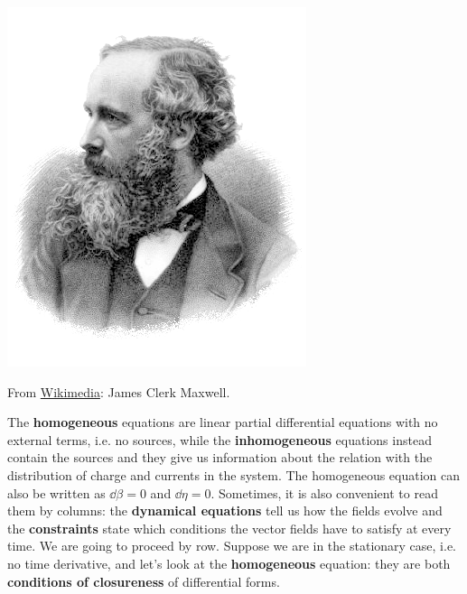 \documentclass[../main.tex]{subfiles}
\begin{document}
\begin{marginfigure}[-10mm]
	\includegraphics[width=1\linewidth]{images/James_Clerk_Maxwell.png}
	\caption[Photo of Maxwell]{From \href{https://commons.wikimedia.org/wiki/File:James_Clerk_Maxwell.png}{Wikimedia}: James Clerk Maxwell.}
\end{marginfigure}The \textbf{homogeneous} equations are linear partial differential equations with no external terms, i.e. no sources, while the \textbf{inhomogeneous} equations instead contain the sources and they give us information about the relation with the distribution of charge and currents in the system. The homogeneous equation can also be written as $\dd\beta=0$ and $\dd\eta=0$. Sometimes, it is also convenient to read them by columns: the \textbf{dynamical equations} tell us how the fields evolve and the \textbf{constraints} state which conditions the vector fields have to satisfy at every time. We are going to proceed by row. Suppose we are in the stationary case, i.e. no time derivative, and let's look at the \textbf{homogeneous} equation: they are both \textbf{conditions of closureness} of differential forms.
\end{document}
